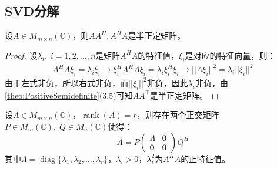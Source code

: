 \subsection{SVD分解}
\begin{theorem}\label{theo:AATPositiveSemidefinite}
	设$A\in M_{m\times n}(\mathbb{C})$，则$AA^H,A^HA$是半正定矩阵。
\end{theorem}
\begin{proof}
	设$\lambda_i,\;i=1,2,\dots,n$是矩阵$A^HA$的特征值，$\xi_i$是对应的特征向量，则：
	\begin{align*}
		A^HA\xi_i=\lambda_i\xi_i\rightarrow
		\xi_i^HA^HA\xi_i=\lambda_i\xi_i^H\xi_i\rightarrow
		||A\xi_i||^2=\lambda_i||\xi_i||^2
	\end{align*}
	由于左式非负，所以右式非负，而$||\xi_i||^2$非负，因此$\lambda_i$非负，由\cref{theo:PositiveSemidefinite}(3.5)可知$AA^{\top}$是半正定矩阵。
\end{proof}
\begin{theorem}\label{theo:SVD}
	设$A\in M_{m\times n}(\mathbb{C})$，$\operatorname{rank}(A)=r$，则存在两个正交矩阵$P\in M_{m}(\mathbb{C}),\;Q\in M_{n}(\mathbb{C})$使得：
	\begin{equation*}
		A=P
		\begin{pmatrix}
			\varLambda & \mathbf{0} \\
			\mathbf{0} & \mathbf{0}
		\end{pmatrix}Q^H
	\end{equation*}
	其中$\varLambda=\operatorname{diag}\{\lambda_1,\lambda_2,\dots,\lambda_r\}$，$\lambda_i>0$，$\lambda_i^2$为$A^HA$的正特征值。
\end{theorem}
